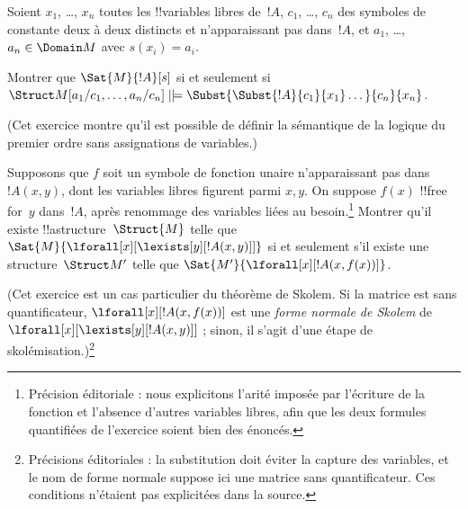 \documentclass[../../../include/open-logic-section]{subfiles}
\begin{document}
\begin{prob}
\begin{enumerate}

\end{enumerate}
Soient $x_1$, \dots, $x_n$ toutes les !!{variable}s libres de~$!A$,
$c_1$, \dots, $c_n$ des symboles de constante deux à deux distincts et n'apparaissant pas
dans~$!A$, et $a_1$, \dots, $a_n \in \Domain M$ avec
$s(x_i) = a_i$.

Montrer que $\Sat{M}{!A}[s]$ si et seulement si
$\Struct M[a_1/c_1,\dots,a_n/c_n]
\VDash \Subst{\Subst{!A}{c_1}{x_1}\dots}{c_n}{x_n}$.

(Cet exercice montre qu'il est possible de définir la sémantique de
la logique du premier ordre sans assignations de variables.)
\end{prob}

\begin{prob}
Supposons que $f$ soit un symbole de fonction unaire n'apparaissant pas
dans~$!A(x,y)$, dont les variables libres figurent parmi $x,y$. On suppose $f(x)$ !!{free for}~$y$ dans~$!A$, après renommage des variables liées au besoin.\footnote{Précision éditoriale : nous explicitons l'arité imposée par l'écriture de la fonction et l'absence d'autres variables libres, afin que les deux formules quantifiées de l'exercice soient bien des énoncés.} Montrer qu'il existe !!a{structure}~$\Struct{M}$
telle que $\Sat{M}{\lforall[x][\lexists[y][!A(x,y)]]}$ si et
seulement s'il existe une structure~$\Struct M'$ telle que
$\Sat{M'}{\lforall[x][!A(x,f(x))]}$.

(Cet exercice est un cas particulier du théorème de Skolem. Si la matrice est sans quantificateur,
$\lforall[x][!A(x,f(x))]$ est une \emph{forme normale de Skolem} de
$\lforall[x][\lexists[y][!A(x,y)]]$ ; sinon, il s'agit d'une étape de skolémisation.)\footnote{Précisions éditoriales : la substitution doit éviter la capture des variables, et le nom de forme normale suppose ici une matrice sans quantificateur. Ces conditions n'étaient pas explicitées dans la source.}
\end{prob}
\end{document}
